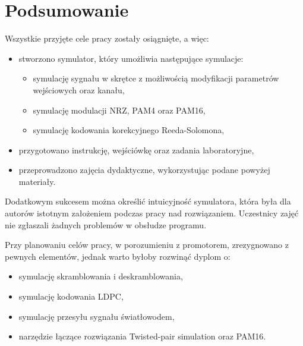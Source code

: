 \section{Podsumowanie}

Wszystkie przyjęte cele pracy zostały osiągnięte, a więc:
\begin{itemize}
    \item stworzono symulator, który umożliwia następujące symulacje:
    \begin{itemize}
        \item symulację sygnału w skrętce z możliwością modyfikacji parametrów wejściowych oraz kanału,
        \item symulację modulacji NRZ, PAM4 oraz PAM16,
        \item symulację kodowania korekcyjnego Reeda-Solomona,
    \end{itemize}
    \item przygotowano instrukcję, wejściówkę oraz zadania laboratoryjne,
    \item przeprowadzono zajęcia dydaktyczne, wykorzystując podane powyżej materiały.
\end{itemize}

Dodatkowym sukcesem można określić intuicyjność symulatora, która była dla autorów istotnym założeniem podczas pracy nad rozwiązaniem. Uczestnicy zajęć nie zgłaszali żadnych problemów w obsłudze programu.

Przy planowaniu celów pracy, w porozumieniu z promotorem, zrezygnowano z pewnych elementów, jednak warto byłoby rozwinąć dyplom o:
\begin{itemize}
    \item symulację skramblowania i deskramblowania,
    \item symulację kodowania LDPC,
    \item symulację przesyłu sygnału światłowodem,
    \item narzędzie łączące rozwiązania Twisted-pair simulation oraz PAM16.
\end{itemize}